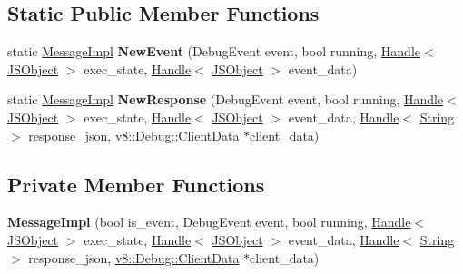 \subsection*{Static Public Member Functions}
\begin{DoxyCompactItemize}
\item 
static \hyperlink{classv8_1_1internal_1_1_message_impl}{Message\+Impl} {\bfseries New\+Event} (Debug\+Event event, bool running, \hyperlink{classv8_1_1internal_1_1_handle}{Handle}$<$ \hyperlink{classv8_1_1internal_1_1_j_s_object}{J\+S\+Object} $>$ exec\+\_\+state, \hyperlink{classv8_1_1internal_1_1_handle}{Handle}$<$ \hyperlink{classv8_1_1internal_1_1_j_s_object}{J\+S\+Object} $>$ event\+\_\+data)\hypertarget{classv8_1_1internal_1_1_message_impl_aef580b1b84a58d691d48c9cc366df3df}{}\label{classv8_1_1internal_1_1_message_impl_aef580b1b84a58d691d48c9cc366df3df}

\item 
static \hyperlink{classv8_1_1internal_1_1_message_impl}{Message\+Impl} {\bfseries New\+Response} (Debug\+Event event, bool running, \hyperlink{classv8_1_1internal_1_1_handle}{Handle}$<$ \hyperlink{classv8_1_1internal_1_1_j_s_object}{J\+S\+Object} $>$ exec\+\_\+state, \hyperlink{classv8_1_1internal_1_1_handle}{Handle}$<$ \hyperlink{classv8_1_1internal_1_1_j_s_object}{J\+S\+Object} $>$ event\+\_\+data, \hyperlink{classv8_1_1internal_1_1_handle}{Handle}$<$ \hyperlink{classv8_1_1internal_1_1_string}{String} $>$ response\+\_\+json, \hyperlink{classv8_1_1_debug_1_1_client_data}{v8\+::\+Debug\+::\+Client\+Data} $\ast$client\+\_\+data)\hypertarget{classv8_1_1internal_1_1_message_impl_a3be5a0658500e47124d319b5a2989e53}{}\label{classv8_1_1internal_1_1_message_impl_a3be5a0658500e47124d319b5a2989e53}

\end{DoxyCompactItemize}
\subsection*{Private Member Functions}
\begin{DoxyCompactItemize}
\item 
{\bfseries Message\+Impl} (bool is\+\_\+event, Debug\+Event event, bool running, \hyperlink{classv8_1_1internal_1_1_handle}{Handle}$<$ \hyperlink{classv8_1_1internal_1_1_j_s_object}{J\+S\+Object} $>$ exec\+\_\+state, \hyperlink{classv8_1_1internal_1_1_handle}{Handle}$<$ \hyperlink{classv8_1_1internal_1_1_j_s_object}{J\+S\+Object} $>$ event\+\_\+data, \hyperlink{classv8_1_1internal_1_1_handle}{Handle}$<$ \hyperlink{classv8_1_1internal_1_1_string}{String} $>$ response\+\_\+json, \hyperlink{classv8_1_1_debug_1_1_client_data}{v8\+::\+Debug\+::\+Client\+Data} $\ast$client\+\_\+data)\hypertarget{classv8_1_1internal_1_1_message_impl_ae9cd3559d8a6186b7f0fb3bc86168b34}{}\label{classv8_1_1internal_1_1_message_impl_ae9cd3559d8a6186b7f0fb3bc86168b34}

\end{DoxyCompactItemize}
